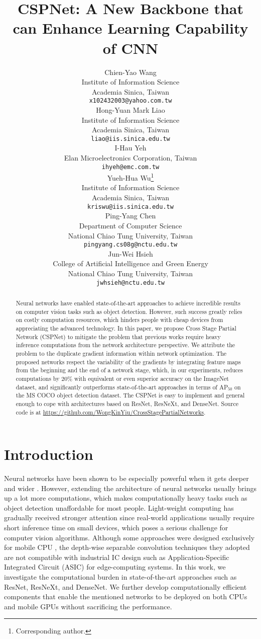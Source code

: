 \documentclass{article}
\title{CSPNet: A New Backbone that can Enhance Learning Capability of CNN}
\author{
  Chien-Yao Wang \\
  Institute of Information Science\\
  Academia Sinica, Taiwan\\
  \texttt{x102432003@yahoo.com.tw} \\
  \And
  Hong-Yuan Mark Liao \\
  Institute of Information Science\\
  Academia Sinica, Taiwan\\
  \texttt{liao@iis.sinica.edu.tw} \\
  \And
  I-Hau Yeh \\
  Elan Microelectronics Corporation, Taiwan\\
  \texttt{ihyeh@emc.com.tw} \\
  \And
  Yueh-Hua Wu\thanks{Corresponding author.} \\
  Institute of Information Science\\
  Academia Sinica, Taiwan\\
  \texttt{kriswu@iis.sinica.edu.tw} \\
  \And
  Ping-Yang Chen \\
  Department of Computer Science\\
  National Chiao Tung University, Taiwan\\
  \texttt{pingyang.cs08g@nctu.edu.tw} \\
  \And
  Jun-Wei Hsieh \\
  College of Artificial Intelligence and Green Energy\\
  National Chiao Tung University, Taiwan\\
  \texttt{jwhsieh@nctu.edu.tw} \\
}
\begin{document}
\maketitle

\begin{abstract}
   Neural networks have enabled state-of-the-art approaches to achieve incredible results on computer vision tasks such as object detection.  However, such success greatly relies on costly computation resources, which hinders people with cheap devices from appreciating the advanced technology.  In this paper, we propose Cross Stage Partial Network (CSPNet) to mitigate the problem that previous works require heavy inference computations from the network architecture perspective.  We attribute the problem to the duplicate gradient information within network optimization.  The proposed networks respect the variability of the gradients by integrating feature maps from the beginning and the end of a network stage, which, in our experiments, reduces computations by 20\% with equivalent or even superior accuracy on the ImageNet dataset, and significantly outperforms state-of-the-art approaches in terms of AP$_{50}$ on the MS COCO object detection dataset.  The CSPNet is easy to implement and general enough to cope with architectures based on ResNet, ResNeXt, and DenseNet. Source code is at \url{https://github.com/WongKinYiu/CrossStagePartialNetworks}.
\end{abstract}





\section{Introduction}

Neural networks have been shown to be especially powerful when it gets deeper \cite{he2016deep, xie2017aggregated, huang2017densely} and wider \cite{Zagoruyko2016WRN}. However, extending the architecture of neural networks usually brings up a lot more computations, which makes computationally heavy tasks such as object detection unaffordable for most people. Light-weight computing has gradually received stronger attention since real-world applications usually require short inference time on small devices, which poses a serious challenge for computer vision algorithms. Although some approaches were designed exclusively for mobile CPU \cite{howard2017mobilenets, sandler2018mobilenetv2, howard2019searching, tan2019mnasnet, zhang2018shufflenet, ma2018shufflenetv2}, the depth-wise separable convolution techniques they adopted are not compatible with industrial IC design such as Application-Specific Integrated Circuit (ASIC) for edge-computing systems.
In this work, we investigate the computational burden in state-of-the-art approaches such as ResNet, ResNeXt, and DenseNet. We further develop computationally efficient components that enable the mentioned networks to be deployed on both CPUs and mobile GPUs without sacrificing the performance.
\end{document}
